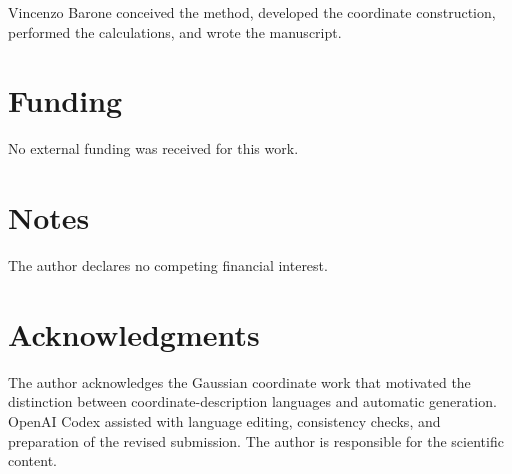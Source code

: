 \documentclass[journal=jctcce,manuscript=article,layout=traditional]{achemso}
\providecommand{\href}[2]{#2}
\theoremstyle{definition}
\begin{document}
Vincenzo Barone conceived the method, developed the coordinate construction,
performed the calculations, and wrote the manuscript.

\section*{Funding}

No external funding was received for this work.

\section*{Notes}

The author declares no competing financial interest.

\section*{Acknowledgments}

The author acknowledges the Gaussian coordinate work that motivated the distinction
between coordinate-description languages and automatic generation.
{\href{https://openai.com/codex/}{OpenAI Codex} assisted with language editing, consistency
checks, and preparation of the revised submission.  The author is responsible
for the scientific content.}


\end{document}
